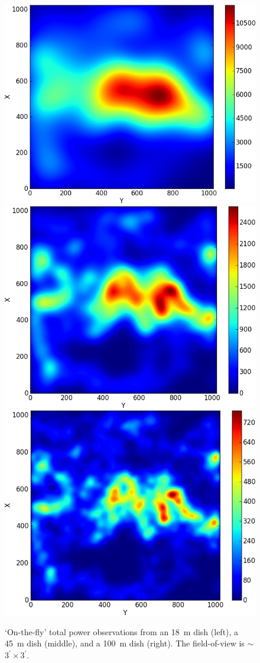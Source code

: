\documentclass[12pt]{article}
\begin{document}
{\begin{figure}
\centering
\includegraphics[width=0.325\columnwidth]{figs54/otf18.png} \includegraphics[width=0.325\columnwidth]{figs54/otf45.png} 
\includegraphics[width=0.325\columnwidth]{figs54/otf100.png}
\caption{`On-the-fly' total power observations from an \SI{18}{\meter} dish (left), a \SI{45}{\meter} dish (middle), and a \SI{100}{\meter} dish (right). The field-of-view is $\sim$$3^\prime \times 3^\prime$.} 
\label{fig:otf}

\end{figure}

}
\end{document}
